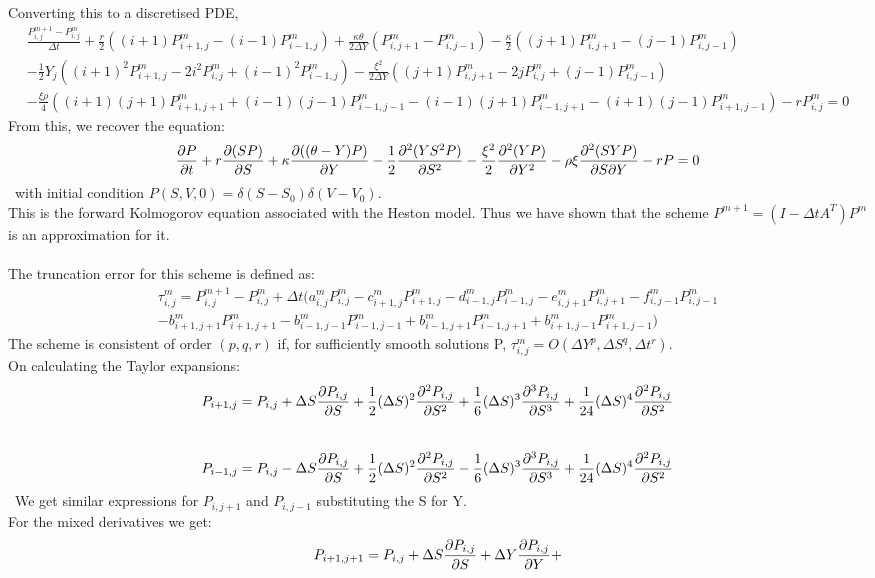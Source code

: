 \documentclass{article}
\begin{document}
\begin{enumerate}
Converting this to a discretised PDE,
\begin{align*}
\frac{P^{m+1}_{i,j}-P^{m}_{i,j}}{\Delta{t}} + \frac{r}{2}((i+1)P^m_{i+1,j}-(i-1)P^m_{i-1,j}) + \frac{\kappa\theta}{2\Delta{Y}}(P^m_{i,j+1}-P^m_{i,j-1}) - \frac{\kappa}{2}((j+1)P^m_{i,j+1}-(j-1)P^m_{i,j-1}) \\
- \frac{1}{2}Y_j((i+1)^2P^m_{i+1,j}-2i^2P^m_{i,j}+(i-1)^2P^m_{i-1,j})  - \frac{\xi^2}{2\Delta{Y}}((j+1)P^m_{i,j+1}-2jP^m_{i,j}+(j-1)P^m_{i,j-1})\\
- \frac{\xi\rho}{4}((i+1)(j+1)P^m_{i+1,j+1}+(i-1)(j-1)P^m_{i-1,j-1}-(i-1)(j+1)P^m_{i-1,j+1}-(i+1)(j-1)P^m_{i+1,j-1}) - rP^m_{i,j} = 0
\end{align*}
From this, we recover the equation:
\[\pdv{P}{t} + r\pdv{(SP)}{S} + \kappa\pdv{((\theta - Y)P)}{Y} -\frac{1}{2}\pdv[2]{(YS^2P)}{S} -\frac{\xi^2}{2}\pdv[2]{(YP)}{Y} - \rho\xi\pdv{(SYP)}{S}{Y} -rP= 0\]\
with initial condition $P(S,V,0) = \delta(S-S_0)\delta(V-V_0)$. \\
This is the forward Kolmogorov equation associated with the Heston model. Thus we have shown that the scheme $P^{m+1} = (I-\Delta{t}A^T)P^m$ is an approximation for it.\\
\\
The truncation error for this scheme is defined as:
\begin{align*}
\tau^m_{i,j} = P^{m+1}_{i,j} - P^m_{i,j} + \Delta{t}(a^m_{i,j}P^m_{i,j} - c^m_{i+1,j}P^m_{i+1,j} - d^m_{i-1,j}P^m_{i-1,j} - e^m_{i,j+1}P^m_{i,j+1} - f^m_{i,j-1}P^m_{i,j-1} \\
-b^m_{i+1,j+1}P^m_{i+1,j+1}-b^m_{i-1,j-1}P^m_{i-1,j-1}+b^m_{i-1,j+1}P^m_{i-1,j+1}+b^m_{i+1,j-1}P^m_{i+1,j-1})
\end{align*}
The scheme is consistent of order $(p,q,r)$ if, for sufficiently smooth solutions P, $\tau^m_{i,j} = O(\Delta{Y}^p, \Delta{S}^q, \Delta{t}^r)$. \\
On calculating the Taylor expansions:
\[P_{i+1,j} = P_{i,j} + \Delta{S}\pdv{P_{i,j}}{S}+ \frac{1}{2}(\Delta{S})^2\pdv[2]{P_{i,j}}{S}+ \frac{1}{6}(\Delta{S})^3\pdv[3]{P_{i,j}}{S} + \frac{1}{24}(\Delta{S})^4\pdv[2]{P_{i,j}}{S}\]\
\[P_{i-1,j} = P_{i,j} - \Delta{S}\pdv{P_{i,j}}{S} + \frac{1}{2}(\Delta{S})^2\pdv[2]{P_{i,j}}{S}- \frac{1}{6}(\Delta{S})^3\pdv[3]{P_{i,j}}{S} + \frac{1}{24}(\Delta{S})^4\pdv[2]{P_{i,j}}{S}\]\
We get similar expressions for $P_{i,j+1}$ and $P_{i,j-1}$ substituting the S for Y. \\
For the mixed derivatives we get:
\begin{align*}
P_{i+1,j+1} = P_{i,j} + \Delta{S}\pdv{P_{i,j}}{S}+ \Delta{Y}\pdv{P_{i,j}}{Y} + 

\end{align*}
\end{enumerate}
\end{document}
